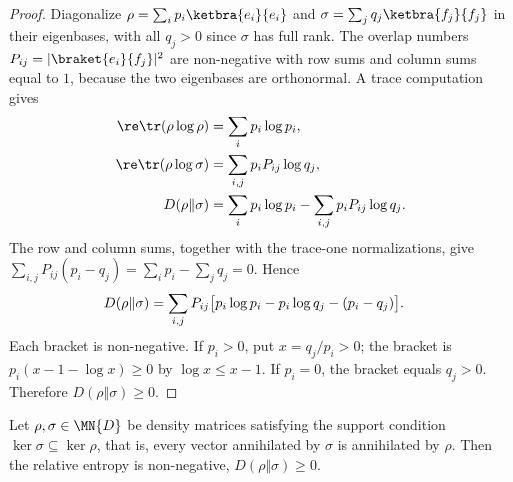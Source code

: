 \begin{proof}\leanok
    Diagonalize $\rho=\sum_i p_i\ketbra{e_i}{e_i}$ and
    $\sigma=\sum_j q_j\ketbra{f_j}{f_j}$ in their eigenbases, with all
    $q_j>0$ since $\sigma$ has full rank. The overlap numbers
    $P_{ij}=\lvert\braket{e_i}{f_j}\rvert^2$ are non-negative with row sums and
    column sums equal to $1$, because the two eigenbases are orthonormal. A trace
    computation gives
    \begin{align}
        \re\tr(\rho\log\rho)
         & =\sum_i p_i\log p_i,
        \notag                                              \\
        \re\tr(\rho\log\sigma)
         & =\sum_{i,j}p_iP_{ij}\log q_j,
        \notag                                              \\
        D(\rho\Vert\sigma)
         & =\sum_i p_i\log p_i-\sum_{i,j}p_iP_{ij}\log q_j.
        \notag
    \end{align}
    The row and column sums, together with the trace-one normalizations, give
    $\sum_{i,j}P_{ij}(p_i-q_j)=\sum_i p_i-\sum_jq_j=0$. Hence
    \begin{align}
        D(\rho\Vert\sigma)
         & =\sum_{i,j}P_{ij}
        \bigl[p_i\log p_i-p_i\log q_j-(p_i-q_j)\bigr].
        \notag
    \end{align}
    Each bracket is non-negative. If $p_i>0$, put $x=q_j/p_i>0$; the bracket
    is $p_i(x-1-\log x)\geq0$ by $\log x\leq x-1$. If $p_i=0$, the bracket
    equals $q_j>0$. Therefore $D(\rho\Vert\sigma)\geq0$.
\end{proof}

\begin{theorem}\label{thm:klein_inequality_general}
    \leanok
    Let $\rho,\sigma\in\MN{D}$ be density matrices satisfying the support
    condition $\ker\sigma\subseteq\ker\rho$, that is, every vector annihilated by
    $\sigma$ is annihilated by $\rho$. Then the relative entropy is non-negative,
    $D(\rho\Vert\sigma)\ge0$.
\end{theorem}

